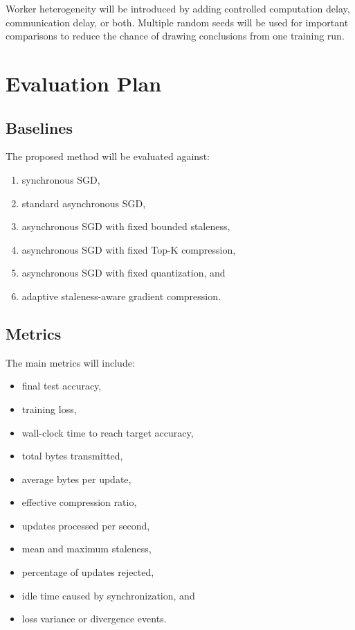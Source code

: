 \documentclass[conference]{IEEEtran}
\begin{document}
Worker heterogeneity will be introduced by adding controlled computation delay, communication delay, or both. Multiple random seeds will be used for important comparisons to reduce the chance of drawing conclusions from one training run.

\section{Evaluation Plan}

\subsection{Baselines}

The proposed method will be evaluated against:
\begin{enumerate}
    \item synchronous SGD,
    \item standard asynchronous SGD,
    \item asynchronous SGD with fixed bounded staleness,
    \item asynchronous SGD with fixed Top-K compression,
    \item asynchronous SGD with fixed quantization, and
    \item adaptive staleness-aware gradient compression.
\end{enumerate}

\subsection{Metrics}

The main metrics will include:
\begin{itemize}
    \item final test accuracy,
    \item training loss,
    \item wall-clock time to reach target accuracy,
    \item total bytes transmitted,
    \item average bytes per update,
    \item effective compression ratio,
    \item updates processed per second,
    \item mean and maximum staleness,
    \item percentage of updates rejected,
    \item idle time caused by synchronization, and
    \item loss variance or divergence events.
\end{itemize}
\end{document}
